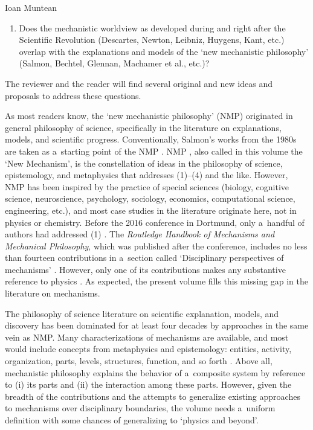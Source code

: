 \begin{recengenv}{Ioan Muntean}
\begin{enumerate}[label={(\arabic*)}]
\item Does the mechanistic worldview as developed during and right after the Scientific Revolution (Descartes, Newton, Leibniz, Huygens, Kant, etc.) overlap with the explanations and models of the ‘new mechanistic philosophy' (Salmon, Bechtel, Glennan, Machamer et al., etc.)?
\end{enumerate}

The reviewer and the reader will find several original and new ideas and proposals to address these questions.

As most readers know, the ‘new mechanistic philosophy' (NMP) originated in general philosophy of science, specifically in the literature on explanations, models, and scientific progress. Conventionally, Salmon's works from the 1980s are taken as a~starting point of the NMP
\parencites[][]{salmon_scientific_1984}[][]{salmon_four_1989}. %
 NMP 
\parencites[][]{glennan_new_2017}[][]{illari_routledge_2017}, %
 also called in this volume the ‘New Mechanism', is the constellation of ideas in the philosophy of science, epistemology, and metaphysics that addresses (1)–(4) and the like. However, NMP has been inspired by the practice of special sciences (biology, cognitive science, neuroscience, psychology, sociology, economics, computational science, engineering, etc.), and most case studies in the literature originate here, not in physics or chemistry. Before the 2016 conference in Dortmund, only a~handful of authors had addressed (1) 
\parencites[][]{illari_what_2011}[][]{kuhlmann_relation_2014}. %
 The \textit{Routledge Handbook of Mechanisms and Mechanical Philosophy}, which was published after the conference, includes no less than fourteen contributions in a~section called ‘Disciplinary perspectives of mechanisms' 
\parencite[][]{illari_routledge_2017}. %
 However, only one of its contributions makes any substantive reference to physics 
\parencite[][]{kuhlmann_mechanisms_2017}. %
 As expected, the present volume fills this missing gap in the literature on mechanisms.

The philosophy of science literature on scientific explanation, models, and discovery has been dominated for at least four decades by approaches in the same vein as NMP. Many characterizations of mechanisms are available, and most would include concepts from metaphysics and epistemology: entities, activity, organization, parts, levels, structures, function, and so forth
\parencite[][]{illari_routledge_2017}. %
 Above all, mechanistic philosophy explains the behavior of a~composite system by reference to (i) its parts and (ii) the interaction among these parts. However, given the breadth of the contributions and the attempts to generalize existing approaches to mechanisms over disciplinary boundaries, the volume needs a~uniform definition with some chances of generalizing to ‘physics and beyond'.


\end{recengenv}

